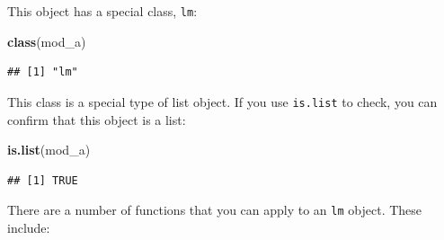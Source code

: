 \documentclass[]{book}
\makeatletter
\newenvironment{Shaded}{\begin{snugshade}}{\end{snugshade}}
\newcommand{\KeywordTok}[1]{\textcolor[rgb]{0.13,0.29,0.53}{\textbf{#1}}}
\newcommand{\NormalTok}[1]{#1}
\newenvironment{kframe}{%
\medskip{}
\setlength{\fboxsep}{.8em}
 \def\at@end@of@kframe{}%
 \ifinner\ifhmode%
  \def\at@end@of@kframe{\end{minipage}}%
  \begin{minipage}{\columnwidth}%
 \fi\fi%
 \def\FrameCommand##1{\hskip\@totalleftmargin \hskip-\fboxsep
 \colorbox{shadecolor}{##1}\hskip-\fboxsep
     \hskip-\linewidth \hskip-\@totalleftmargin \hskip\columnwidth}%
 \MakeFramed {\advance\hsize-\width
   \@totalleftmargin\z@ \linewidth\hsize
   \@setminipage}}%
 {\par\unskip\endMakeFramed%
 \at@end@of@kframe}
\renewenvironment{Shaded}{\begin{kframe}}{\end{kframe}}
\theoremstyle{definition}
\theoremstyle{definition}
\theoremstyle{definition}
\theoremstyle{remark}
\makeatother
\begin{document}
This object has a special class, \texttt{lm}:

\begin{Shaded}
\begin{Highlighting}[]
\KeywordTok{class}\NormalTok{(mod_a)}
\end{Highlighting}
\end{Shaded}

\begin{verbatim}
## [1] "lm"
\end{verbatim}

This class is a special type of list object. If you use \texttt{is.list}
to check, you can confirm that this object is a list:

\begin{Shaded}
\begin{Highlighting}[]
\KeywordTok{is.list}\NormalTok{(mod_a)}
\end{Highlighting}
\end{Shaded}

\begin{verbatim}
## [1] TRUE
\end{verbatim}

There are a number of functions that you can apply to an \texttt{lm}
object. These include:
\end{document}
